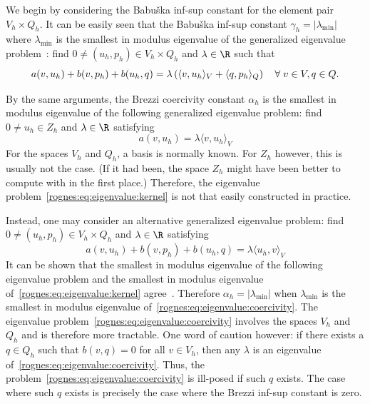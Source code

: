 We begin by considering the Babu\v ska inf-sup constant for the
element pair $V_h \times Q_h$. It can be easily seen that the Babu\v
ska inf-sup constant $\gamma_h = |\lambda_{\min}|$ where
$\lambda_{\min}$ is the smallest in modulus eigenvalue of the
generalized eigenvalue problem~\cite{ArnoldRognes2009, Malkus1981}:
find $0 \not = (u_h, p_h) \in V_h \times Q_h$ and $\lambda \in \R$
such that
\begin{equation}
  \label{rognes:eq:eigenvalue:babuska}
  a(v, u_h) + b(v, p_h) + b(u_h, q)
  = \lambda
  \left (\langle v, u_h \rangle_{V} + \langle q, p_h \rangle_{Q} \right )
  \quad \forall \; v \in V, q \in Q.
\end{equation}

By the same arguments, the Brezzi coercivity constant $\alpha_h$ is
the smallest in modulus eigenvalue of the following generalized
eigenvalue problem: find $0 \not = u_h \in Z_h$ and $\lambda \in \R$
satisfying
\begin{equation}
  \label{rognes:eq:eigenvalue:kernel}
  a(v, u_h) = \lambda \langle v, u_h \rangle_{V}
\end{equation}
For the spaces $V_h$ and $Q_h$, a basis is normally known. For $Z_h$
however, this is usually not the case. (If it had been, the space
$Z_h$ might have been better to compute with in the first place.)
Therefore, the eigenvalue problem~\eqref{rognes:eq:eigenvalue:kernel} is not
that easily constructed in practice.

Instead, one may consider an alternative generalized eigenvalue
problem: find $0 \not = (u_h, p_h) \in V_h \times Q_h$ and $\lambda
\in \R$ satisfying
\begin{equation}
  \label{rognes:eq:eigenvalue:coercivity}
  a(v, u_h) + b(v, p_h) + b(u_h, q) = \lambda \langle u_h, v \rangle_{V}
\end{equation}
It can be shown that the smallest in modulus eigenvalue of the
following eigenvalue problem and the smallest in modulus eigenvalue
of~\eqref{rognes:eq:eigenvalue:kernel}
agree~\cite{ArnoldRognes2009}. Therefore $\alpha_h = |\lambda_{\min}|$
when $\lambda_{\min}$ is the smallest in modulus eigenvalue
of~\eqref{rognes:eq:eigenvalue:coercivity}. The eigenvalue
problem~\eqref{rognes:eq:eigenvalue:coercivity} involves the spaces
$V_h$ and $Q_h$ and is therefore more tractable. One word of caution
however: if there exists a $q \in Q_h$ such that $b(v, q) = 0$ for all
$v \in V_h$, then any $\lambda$ is an eigenvalue
of~\eqref{rognes:eq:eigenvalue:coercivity}. Thus, the
problem~\eqref{rognes:eq:eigenvalue:coercivity} is ill-posed if such
$q$ exists. The case where such $q$ exists is precisely the case where
the Brezzi inf-sup constant is zero.

